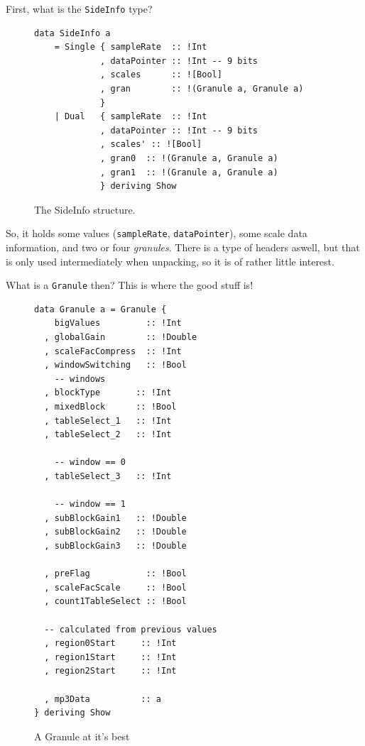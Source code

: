 \documentclass[a4paper,12pt]{article}
\begin{document}
    First, what is the \texttt{SideInfo} type?
\begin{figure}[h]
  \begin{center}
    \begin{lstlisting}
data SideInfo a
    = Single { sampleRate  :: !Int
             , dataPointer :: !Int -- 9 bits
             , scales      :: ![Bool]
             , gran        :: !(Granule a, Granule a)
             }
    | Dual   { sampleRate  :: !Int
             , dataPointer :: !Int -- 9 bits
             , scales' :: ![Bool]
             , gran0  :: !(Granule a, Granule a)
             , gran1  :: !(Granule a, Granule a)
             } deriving Show
    \end{lstlisting}
    \caption{The SideInfo structure.}\label{fig:sideinfo_struct}
  \end{center}
\end{figure}

    So, it holds some values (\texttt{sampleRate}, \texttt{dataPointer}), some
    scale data information, and two or four \textit{granules}. There is a type
    of headers aswell, but that is only used intermediately when unpacking, so
    it is of rather little interest.

    What is a \texttt{Granule} then? This is where the good stuff is!
\begin{figure}[h]
  \begin{center}
    \begin{lstlisting}
data Granule a = Granule {
    bigValues         :: !Int
  , globalGain        :: !Double
  , scaleFacCompress  :: !Int
  , windowSwitching   :: !Bool
    -- windows
  , blockType       :: !Int
  , mixedBlock      :: !Bool
  , tableSelect_1   :: !Int
  , tableSelect_2   :: !Int

    -- window == 0
  , tableSelect_3   :: !Int

    -- window == 1
  , subBlockGain1   :: !Double
  , subBlockGain2   :: !Double
  , subBlockGain3   :: !Double

  , preFlag           :: !Bool
  , scaleFacScale     :: !Bool
  , count1TableSelect :: !Bool

  -- calculated from previous values
  , region0Start     :: !Int
  , region1Start     :: !Int
  , region2Start     :: !Int

  , mp3Data          :: a
} deriving Show
    \end{lstlisting}
    \caption{A Granule at it's best}\label{fig:granule_type}
  \end{center}
\end{figure}
\end{document}
